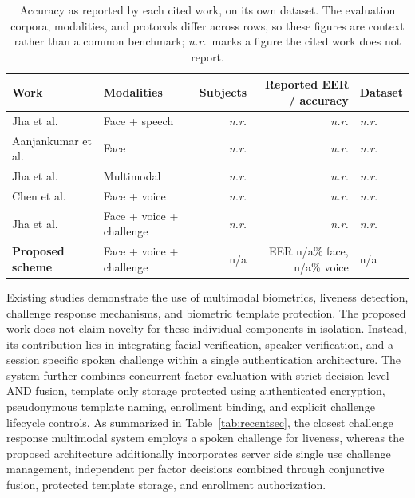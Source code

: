 \documentclass[runningheads]{llncs}
\newcommand{\nrmark}{\textit{n.r.}}
\providecommand{\EvalCorpusName}{n/a}
\providecommand{\EvalSubjects}{n/a}
\providecommand{\EvalFaceEER}{n/a}
\providecommand{\EvalVoiceEER}{n/a}
\begin{document}
{{%
\begin{table}[!t]
\caption{Accuracy as reported by each cited work, on its own dataset. The evaluation corpora, modalities, and protocols differ across rows, so these figures are context rather than a common benchmark; \nrmark\ marks a figure the cited work does not report.}
\label{tab:recentacc}
\centering
\renewcommand{\arraystretch}{1.18}
\setlength{\tabcolsep}{4pt}
\footnotesize
\begin{tabular}{llrrl}
\toprule
\textbf{Work} & \textbf{Modalities} & \textbf{Subjects} & \textbf{Reported EER / accuracy} & \textbf{Dataset} \\
\midrule
Jha et al.~\cite{jha2024featurefusion} & Face + speech & \nrmark & \nrmark & \nrmark \\
Aanjankumar et al.~\cite{aanjankumar2025smartcity} & Face & \nrmark & \nrmark & \nrmark \\
Jha et al.~\cite{jha2025ensemble} & Multimodal & \nrmark & \nrmark & \nrmark \\
Chen et al.~\cite{chen2026twostep} & Face + voice & \nrmark & \nrmark & \nrmark \\
Jha et al.~\cite{jha2025challenge} & Face + voice + challenge & \nrmark & \nrmark & \nrmark \\
\midrule
\textbf{Proposed scheme} & Face + voice + challenge & \EvalSubjects & EER \EvalFaceEER\% face, \EvalVoiceEER\% voice & \EvalCorpusName \\
\bottomrule
\end{tabular}
\end{table}

Existing studies demonstrate the use of multimodal biometrics, liveness detection, challenge response mechanisms, and biometric template protection. The proposed work does not claim novelty for these individual components in isolation. Instead, its contribution lies in integrating facial verification, speaker verification, and a session specific spoken challenge within a single authentication architecture. The system further combines concurrent factor evaluation with strict decision level AND fusion, template only storage protected using authenticated encryption, pseudonymous template naming, enrollment binding, and explicit challenge lifecycle controls. As summarized in Table~\ref{tab:recentsec}, the closest challenge response multimodal system \cite{jha2025challenge} employs a spoken challenge for liveness, whereas the proposed architecture additionally incorporates server side single use challenge management, independent per factor decisions combined through conjunctive fusion, protected template storage, and enrollment authorization.

}}
\end{document}
